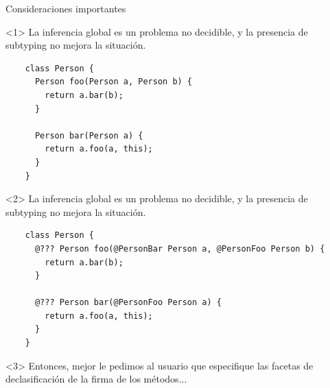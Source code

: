 \documentclass[aspectratio=169,10pt]{beamer}
\begin{document}
\begin{frame}[fragile]{Consideraciones importantes}

  \begin{onlyenv}<1>
		\only<2-|handout:0>{\stepcounter{framenumber}}
    La inferencia global es un problema no decidible, y la presencia de subtyping no mejora la situación.
    \begin{lstlisting}
    class Person {
      Person foo(Person a, Person b) {
        return a.bar(b);
      }

      Person bar(Person a) {
        return a.foo(a, this);
      }
    }
    \end{lstlisting}
  \end{onlyenv}
  \begin{onlyenv}<2>
    La inferencia global es un problema no decidible, y la presencia de subtyping no mejora la situación.
    \begin{lstlisting}
    class Person {
      @??? Person foo(@PersonBar Person a, @PersonFoo Person b) {
        return a.bar(b);
      }

      @??? Person bar(@PersonFoo Person a) {
        return a.foo(a, this);
      }
    }
    \end{lstlisting}
  \end{onlyenv}

  \begin{onlyenv}<3>
    Entonces, mejor le pedimos al usuario que especifique las facetas de declasificación de la firma de los métodos...
  \end{onlyenv}

\end{frame}
\end{document}
